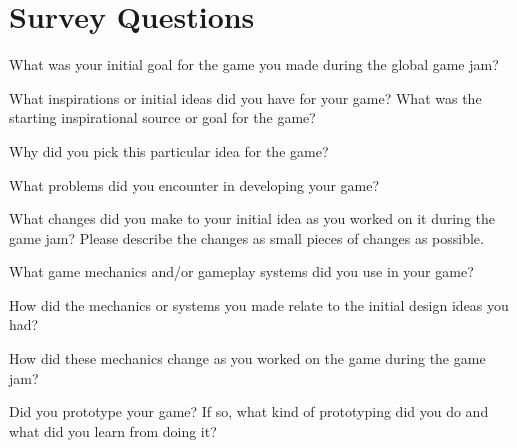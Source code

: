 \documentclass{sig-alternate}
\begin{document}
\section{Survey Questions}
\label{sec:survey}
\begin{list}{}{\leftmargin=10pt \itemindent=0em \itemsep=0pt}
\item What was your initial goal for the game you made during the global game jam?
\item What inspirations or initial ideas did you have for your game? What was the starting inspirational source or goal for the game?
\item Why did you pick this particular idea for the game?
\item What problems did you encounter in developing your game?
\item What changes did you make to your initial idea as you worked on it during the game jam? Please describe the changes as small pieces of changes as possible.
\item What game mechanics and/or gameplay systems did you use in your game?
\item How did the mechanics or systems you made relate to the initial design ideas you had?
\item How did these mechanics change as you worked on the game during the game jam?
\item Did you prototype your game? If so, what kind of prototyping did you do and what did you learn from doing it?
\end{list}
\end{document}
